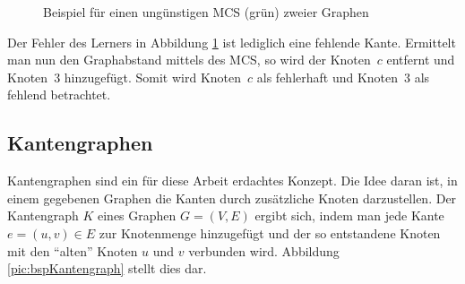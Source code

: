 \begin{figure}[htb]
\centering
\hspace*{\fill} 
\hspace*{\fill} 
\hspace*{\fill} 
\caption{Beispiel für einen ungünstigen MCS (grün) zweier Graphen}
\label{pic:bspMCS_GED}
\end{figure}

Der Fehler des Lerners in Abbildung \ref{pic:bspMCS_GED} ist lediglich eine 
fehlende Kante. Ermittelt man nun den Graphabstand mittels des MCS, so wird 
der Knoten~$c$ entfernt und Knoten~$3$ hinzugefügt. Somit wird Knoten~$c$ als 
fehlerhaft und Knoten~$3$ als fehlend betrachtet.

\subsection{Kantengraphen}
Kantengraphen sind ein für diese Arbeit erdachtes Konzept. Die Idee 
daran ist, in einem gegebenen Graphen die Kanten durch zusätzliche 
Knoten darzustellen. Der Kantengraph $K$ eines Graphen $G=(V,E)$ ergibt 
sich, indem man jede Kante $e=(u,v) \in E$ zur Knotenmenge hinzugefügt 
und der so entstandene Knoten mit den "`alten"' Knoten $u$ und $v$ 
verbunden wird. Abbildung \ref{pic:bspKantengraph} stellt dies dar.

